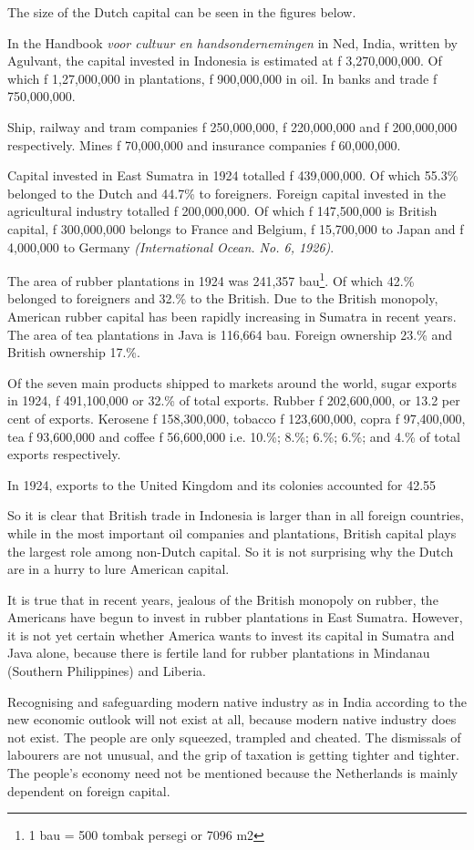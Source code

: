 The size of the Dutch capital can be seen in the figures below.\nline

In the Handbook \emph{voor cultuur en handsondernemingen} in Ned, India, written by Agulvant, the capital 
invested in Indonesia is estimated at f 3,270,000,000. Of which f 1,27,000,000 in plantations, f 900,000,000 in oil. 
In banks and trade f 750,000,000.\nline

Ship, railway and tram companies f 250,000,000, f 220,000,000 and f 200,000,000 respectively. 
Mines f 70,000,000 and insurance companies f 60,000,000.\nline

Capital invested in East Sumatra in 1924 totalled f 439,000,000. Of which 55.3\% belonged to the Dutch and 44.7\% to foreigners. 
Foreign capital invested in the agricultural industry totalled f 200,000,000. Of which f 147,500,000 is British capital, 
f 300,000,000 belongs to France and Belgium, f 15,700,000 to Japan and f 4,000,000 to Germany \emph{(International Ocean. No. 6, 1926)}.\nline

The area of rubber plantations in 1924 was 241,357 bau\footnote[5]{1 bau = 500 tombak persegi or 7096 m2}. Of which 42.\% belonged to foreigners and 32.\% to 
the British. Due to the British monopoly, American rubber capital has been rapidly increasing in Sumatra in 
recent years. The area of tea plantations in Java is 116,664 bau. Foreign ownership 23.\% and British ownership 17.\%.

Of the seven main products shipped to markets around the world, sugar exports in 1924, f 491,100,000 or 32.\% 
of total exports. Rubber f 202,600,000, or 13.2 per cent of exports. Kerosene f 158,300,000, tobacco f 123,600,000, 
copra f 97,400,000, tea f 93,600,000 and coffee f 56,600,000 i.e. 10.\%; 8.\%; 6.\%; 6.\%; and 4.\% of total exports respectively.\nline

In 1924, exports to the United Kingdom and its colonies accounted for 42.55%

So it is clear that British trade in Indonesia is larger than in all foreign countries, while in the most important oil companies and plantations, British capital plays the largest role among non-Dutch capital. So it is not surprising why the Dutch are in a hurry to lure American capital.

It is true that in recent years, jealous of the British monopoly on rubber, 
the Americans have begun to invest in rubber plantations in East Sumatra. However, 
it is not yet certain whether America wants to invest its capital in Sumatra and Java 
alone, because there is fertile land for rubber plantations in Mindanau (Southern Philippines) and Liberia.\nline

Recognising and safeguarding modern native industry as in India according 
to the new economic outlook will not exist at all, because modern native 
industry does not exist. The people are only squeezed, trampled and cheated. 
The dismissals of labourers are not unusual, and the grip of taxation is 
getting tighter and tighter. The people's economy need not be mentioned because 
the Netherlands is mainly dependent on foreign capital.\nline